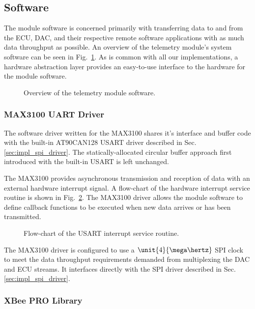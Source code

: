 \subsection{Software}

The module software is concerned primarily with transferring data to and from the ECU, DAC, and their respective remote software applications with as much data throughput as possible. An overview of the telemetry module's system software can be seen in Fig.\ \ref{fig:telemetry_software_implementation}. As is common with all our implementations, a hardware abstraction layer provides an easy-to-use interface to the hardware for the module software.

\begin{figure}[H]
\centering

\caption{Overview of the telemetry module software.}
\label{fig:telemetry_software_implementation}
\end{figure}

\subsubsection{MAX3100 UART Driver}

The software driver written for the MAX3100 shares it's interface and buffer code with the built-in AT90CAN128 USART driver described in Sec. \ref{sec:impl_spi_driver}. The statically-allocated circular buffer approach first introduced with the built-in USART is left unchanged. 

The MAX3100 provides asynchronous transmission and reception of data with an external hardware interrupt signal. A flow-chart of the hardware interrupt service routine is shown in Fig.\ \ref{fig:usart_driver_flow}. The MAX3100 driver allows the module software to define callback functions to be executed when new data arrives or has been transmitted. 

\begin{figure}[H]
\centering

\caption{Flow-chart of the USART interrupt service routine.}
\label{fig:usart_driver_flow}
\end{figure}

The MAX3100 driver is configured to use a $\unit{4}{\mega\hertz}$ SPI clock to meet the data throughput requirements demanded from multiplexing the DAC and ECU streams. It interfaces directly with the SPI driver described in Sec. \ref{sec:impl_spi_driver}.

\subsubsection{XBee PRO Library}

